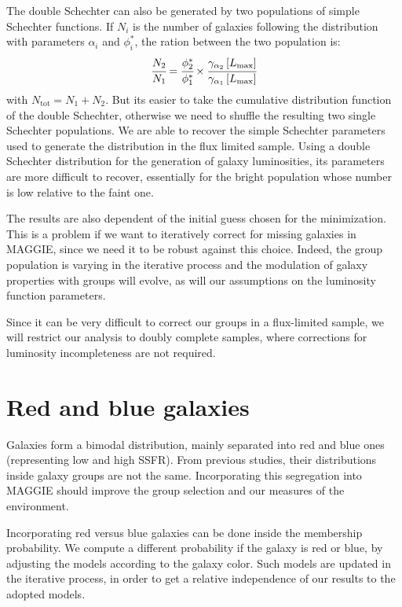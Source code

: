 {    The double Schechter can also be generated by two populations of simple
    Schechter functions. If $N_i$ is the number of galaxies following the
    distribution with parameters $\alpha_i$ and $\phi_i^*$, the ration between
    the two population is:
    \begin{equation}
        \cfrac{N_2}{N_1} =
        \cfrac{\phi_2^*}{\phi_1^*}\times
        \cfrac{\gamma_{\alpha_2} \left[L_{\max}\right]}
            {\gamma_{\alpha_1} \left[L_{\max}\right]}
    \end{equation}
    with $N_\mathrm{tot}=N_1+N_2$. But its easier to take the cumulative
    distribution function of the double Schechter, otherwise we need to shuffle the
    resulting two single Schechter populations.
}
%
We are able to recover the simple Schechter parameters used to generate the
distribution in the flux limited sample. Using a double Schechter distribution
for the generation of galaxy luminosities, its parameters are more difficult to
recover, essentially for the bright population whose number is low relative to
the faint one.

The results are also dependent of the initial guess chosen for the
minimization. This is a problem if we want to iteratively correct for missing
galaxies in MAGGIE, since we need it to be robust against this choice. Indeed,
the group population is varying in the iterative process and the modulation of
galaxy properties with groups will evolve, as will our assumptions on the
luminosity function parameters.

Since it can be very difficult to correct our groups in a flux-limited sample,
we will restrict our analysis to doubly complete samples, where corrections for
luminosity incompleteness are not required.

\section{Red and blue galaxies}

Galaxies form a bimodal distribution, mainly separated into red and blue ones
(representing low and high SSFR). From previous studies, their distributions
inside galaxy groups are not the same. Incorporating this segregation into
MAGGIE should improve the group selection and our measures of the environment.

Incorporating red versus blue galaxies can be done inside the membership
probability. We compute a different probability if the
galaxy is red or blue, by adjusting the models according to the galaxy color.
Such models are updated in the iterative process, in order to get a relative
independence of our results to the adopted models.

